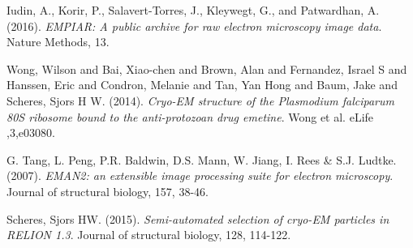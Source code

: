 \documentclass[12pt,a4paper]{article}
\begin{document}
\begin{thebibliography}{9}
Iudin, A., Korir, P., Salavert-Torres, J., Kleywegt, G., and Patwardhan,
 A. (2016). \textit{EMPIAR: A public archive for raw electron microscopy image data}.
 Nature Methods, 13.

Wong, Wilson and Bai, Xiao-chen and Brown, Alan and Fernandez, Israel S and Hanssen, Eric and Condron, Melanie and Tan, Yan Hong and Baum, Jake and Scheres, Sjors H W. (2014). \textit{Cryo-EM structure of the Plasmodium falciparum 80S ribosome bound to the anti-protozoan drug emetine}.
Wong et al. eLife ,3,e03080.

G. Tang, L. Peng, P.R. Baldwin, D.S. Mann, W. Jiang, I. Rees \& S.J. Ludtke. (2007). \textit{EMAN2: an extensible image processing suite for electron microscopy}.
Journal of structural biology, 157, 38-46.

Scheres, Sjors HW. (2015). \textit{Semi-automated selection of cryo-EM particles in RELION 1.3}.
Journal of structural biology, 128, 114-122.

\end{thebibliography}
\end{document}
